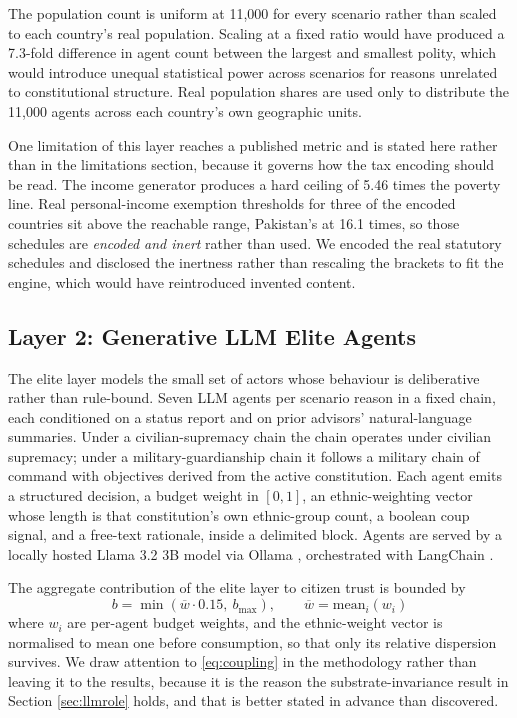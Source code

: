 \documentclass{ieeeaccess}
\begin{document}
The population count is uniform at 11,000 for every scenario rather than
scaled to each country's real population. Scaling at a fixed ratio would
have produced a 7.3-fold difference in agent count between the largest
and smallest polity, which would introduce unequal statistical power
across scenarios for reasons unrelated to constitutional structure. Real
population shares are used only to distribute the 11,000 agents across
each country's own geographic units.

One limitation of this layer reaches a published metric and is stated
here rather than in the limitations section, because it governs how the
tax encoding should be read. The income generator produces a hard
ceiling of 5.46 times the poverty line. Real personal-income exemption
thresholds for three of the encoded countries sit above the reachable
range, Pakistan's at 16.1 times, so those schedules are
\emph{encoded and inert} rather than used. We encoded the real statutory
schedules and disclosed the inertness rather than rescaling the brackets
to fit the engine, which would have reintroduced invented content.

\subsection{Layer 2: Generative LLM Elite Agents}
The elite layer models the small set of actors whose behaviour is
deliberative rather than rule-bound. Seven LLM agents per scenario
reason in a fixed chain, each conditioned on a status report and on
prior advisors' natural-language summaries. Under a civilian-supremacy
chain the chain operates under civilian supremacy; under a
military-guardianship chain it follows a military chain of command with
objectives derived from the active constitution. Each agent emits a
structured decision, a budget weight in $[0,1]$, an ethnic-weighting
vector whose length is that constitution's own ethnic-group count, a
boolean coup signal, and a free-text rationale, inside a delimited
block. Agents are served by a locally hosted Llama 3.2 3B model
\cite{dubey2024llama3,touvron2023llama} via Ollama \cite{ollama2023},
orchestrated with LangChain \cite{chase2022langchain}.

The aggregate contribution of the elite layer to citizen trust is
bounded by
\begin{equation}
b = \min(\overline{w}\cdot 0.15,\ b_{\max}),
\qquad \overline{w} = \mathrm{mean}_i(w_i)
\label{eq:coupling}
\end{equation}
where $w_i$ are per-agent budget weights, and the ethnic-weight vector
is normalised to mean one before consumption, so that only its relative
dispersion survives. We draw attention to \eqref{eq:coupling} in the
methodology rather than leaving it to the results, because it is the
reason the substrate-invariance result in Section \ref{sec:llmrole}
holds, and that is better stated in advance than discovered.
\end{document}
